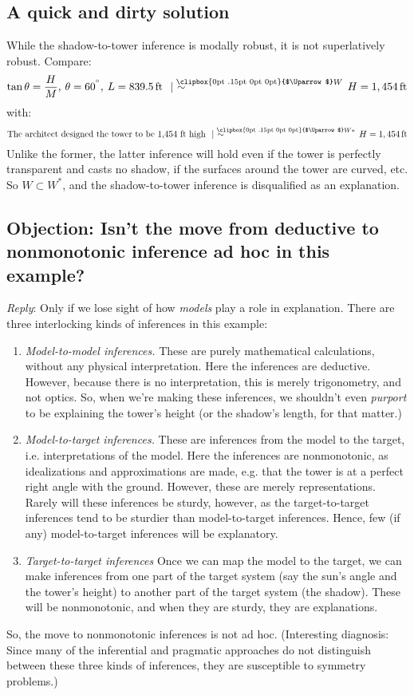\documentclass[11pt]{article}
\makeatletter
\newcommand{\Uuparrow}{%
	\raisebox{.2ex}{\clipbox{0pt .15pt 0pt 0pt}{$\Uparrow$}}
}
\newcommand{\nms}{%
	\mathbin{\mathpalette\@nms\expandafter}
}
\newcommand{\@nms}{\mid\joinrel\mkern-.5mu\sim}
\newcommand{\mrc}[1]{\mathbin{
		\mathchoice
		{\normalsize\hspace{.5mm}\nms^{\mkern-19mu\scriptsize\Uuparrow#1}\hspace{-.5mm}}
		{\normalsize\hspace{.5mm}\nms^{\mkern-19mu\scriptsize\Uuparrow#1}\hspace{-.5mm}}
		{\footnotesize\hspace{.5mm}\nms^{\mkern-13.5mu\fontsize{5.5}{0}\Uuparrow#1}}
		{\scriptsize\nms^{\mkern-10mu\tiny\Uuparrow#1}}
	}
}
\makeatother
\begin{document}
\subsection{A quick and dirty solution}
While the shadow-to-tower inference is modally robust, it is not superlatively robust. Compare: \newline
\begin{equation}
\tan \theta  = \frac{H}{M},\hspace{.5ex} \theta = 60^{\degree},\hspace{.5ex}  L = 839.5\,\text{ft} \,\,\mrc{W}\,\,  H = 1,454\,\text{ft}
\end{equation}
with:
\begin{equation}
\text{The architect designed the tower to be 1,454 ft high} \,\,\mrc{W*}\,\,  H = 1,454\,\text{ft}
\end{equation}
Unlike the former, the latter inference will hold even if the tower is perfectly transparent and casts no shadow, if the surfaces around the tower are curved, etc. So $W \subset W^*$, and the shadow-to-tower inference is disqualified as an explanation.

\subsection{Objection: Isn't the move from deductive to nonmonotonic inference ad hoc in this example?}
\textit {Reply}: Only if we lose sight of how \textit{models} play a role in explanation. There are three interlocking kinds of inferences in this example:
\begin{enumerate}
	\item \textit{Model-to-model inferences.} These are purely mathematical calculations, without any physical interpretation. Here the inferences are deductive. However, because there is no interpretation, this is merely trigonometry, and not optics. So, when we're making these inferences, we shouldn't even \textit{purport} to be explaining the tower's height (or the shadow's length, for that matter.)
	\item \textit{Model-to-target inferences.} These are inferences from the model to the target, i.e. interpretations of the model. Here the inferences are nonmonotonic, as idealizations and approximations are made, e.g. that the tower is at a perfect right angle with the ground. However, these are merely representations. Rarely will these inferences be sturdy, however, as the target-to-target inferences tend to be sturdier than model-to-target inferences. Hence, few (if any) model-to-target inferences will be explanatory.
	\item \textit{Target-to-target inferences} Once we can map the model to the target, we can make inferences from one part of the target system (say the sun's angle and the tower's height) to another part of the target system (the shadow). These will be nonmonotonic, and when they are sturdy, they are explanations.
\end{enumerate}
So, the move to nonmonotonic inferences is not ad hoc. (Interesting diagnosis: Since many of the inferential and pragmatic approaches do not distinguish between these three kinds of inferences, they are susceptible to symmetry problems.)
\end{document}
